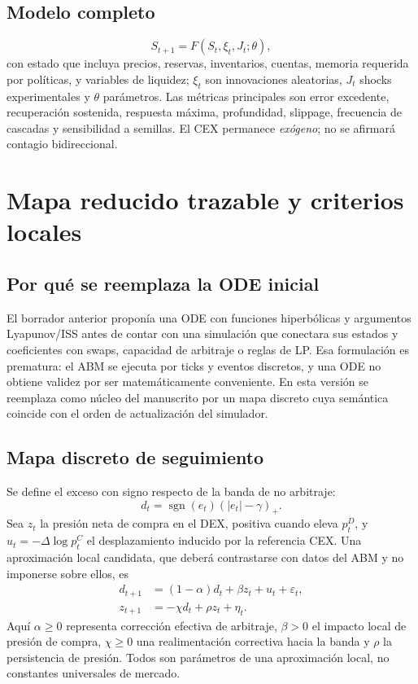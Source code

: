 \documentclass[11pt,a4paper]{article}
\begin{document}
\subsection{Modelo completo}
\begin{equation}
S_{t+1}=F(S_t,\xi_t,J_t;\theta),
\end{equation}
con estado que incluya precios, reservas, inventarios, cuentas, memoria requerida por políticas, y variables de liquidez; $\xi_t$ son innovaciones aleatorias, $J_t$ shocks experimentales y $\theta$ parámetros. Las métricas principales son error excedente, recuperación sostenida, respuesta máxima, profundidad, slippage, frecuencia de cascadas y sensibilidad a semillas. El CEX permanece \emph{exógeno}; no se afirmará contagio bidireccional.
\section{Mapa reducido trazable y criterios locales}
\subsection{Por qué se reemplaza la ODE inicial}
El borrador anterior proponía una ODE con funciones hiperbólicas y argumentos Lyapunov/ISS antes de contar con una simulación que conectara sus estados y coeficientes con swaps, capacidad de arbitraje o reglas de LP. Esa formulación es prematura: el ABM se ejecuta por ticks y eventos discretos, y una ODE no obtiene validez por ser matemáticamente conveniente. En esta versión se reemplaza como núcleo del manuscrito por un mapa discreto cuya semántica coincide con el orden de actualización del simulador.

\subsection{Mapa discreto de seguimiento}
Se define el exceso con signo respecto de la banda de no arbitraje:
\begin{equation}
d_t=\operatorname{sgn}(e_t)(|e_t|-\gamma)_+.
\end{equation}
Sea $z_t$ la presión neta de compra en el DEX, positiva cuando eleva $p_t^D$, y $u_t=-\Delta\log p_t^C$ el desplazamiento inducido por la referencia CEX. Una aproximación local candidata, que deberá contrastarse con datos del ABM y no imponerse sobre ellos, es
\begin{align}
d_{t+1}&=(1-\alpha)d_t+\beta z_t+u_t+\varepsilon_t,\\
z_{t+1}&=-\chi d_t+\rho z_t+\eta_t.
\end{align}
Aquí $\alpha\ge0$ representa corrección efectiva de arbitraje, $\beta>0$ el impacto local de presión de compra, $\chi\ge0$ una realimentación correctiva hacia la banda y $\rho$ la persistencia de presión. Todos son parámetros de una aproximación local, no constantes universales de mercado.
\end{document}
